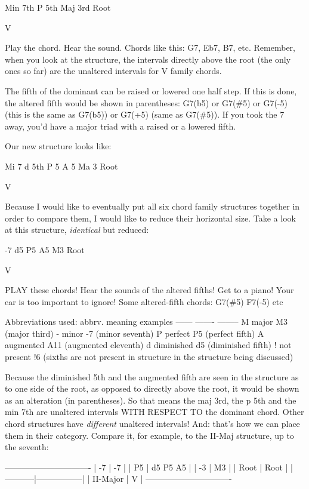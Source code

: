         Min 7th
         P 5th
        Maj 3rd
         Root

          V

Play the chord. Hear the sound. Chords like this: G7, Eb7, B7, etc. Remember,
when you look at the structure, the intervals directly above the root (the
only ones so far) are the unaltered intervals for V family chords.

The fifth of the dominant can be raised or lowered one half step. If this is
done, the altered fifth would be shown in parentheses: G7(b5) or G7(\#5) or
G7(-5) (this is the same as G7(b5)) or G7(+5) (same as G7(\#5)). If you took
the 7 away, you'd have a major triad with a raised or a lowered fifth.

Our new structure looks like:

        Mi 7
 d 5th   P 5   A 5
        Ma 3
        Root

         V

Because I would like to eventually put all six chord family structures
together in order to compare them, I would like to reduce their horizontal
size. Take a look at this structure, \emph{identical} but reduced:

       -7
  d5   P5   A5
       M3
      Root

        V

PLAY these chords! Hear the sounds of the altered fifths! Get to a piano! Your
ear is too important to ignore! Some altered-fifth chords: G7(\#5) F7(-5) etc

Abbreviations used: 
abbrv.  meaning           examples
------  -------           --------
  M      major         M3 (major third)
  -      minor         -7 (minor seventh)
  P      perfect       P5 (perfect fifth)
  A     augmented     A11 (augmented eleventh)
  d     diminished     d5 (diminished fifth)
  !     not present    !6 (sixths are not present
        in structure       in the structure being
                           discussed)

Because the diminished 5th and the augmented fifth are seen in the structure as
to one side of the root, as opposed to directly above the root, it would be 
shown as an alteration (in parentheses). So that means the maj 3rd, the p 5th
and the min 7th are unaltered intervals WITH RESPECT TO the dominant chord.
Other chord structures have \emph{different} unaltered intervals! And: that's how
we can place them in their category. Compare it, for example, to the II-Maj
structure, up to the seventh:

-------------------------------
|    -7     |       -7        |
|    P5     |  d5   P5   A5   |
|    -3     |       M3        |
|   Root    |      Root       |
|-----------|-----------------|
| II-Major  |        V        |
-------------------------------

